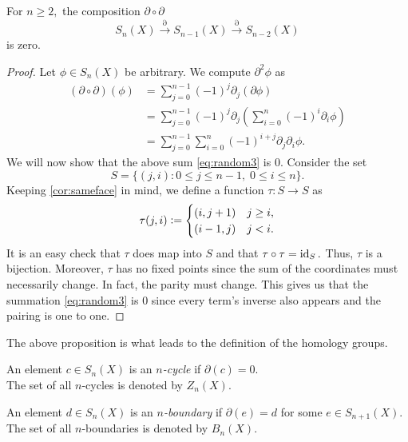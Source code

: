 \documentclass[12pt]{article}
\begin{document}
\begin{prop}
	For $n \ge 2,$ the composition $\partial\circ\partial$
	\begin{equation*} 
		S_n(X) \overset{\partial}{\longrightarrow} S_{n-1}(X) \overset{\partial}{\longrightarrow} S_{n-2}(X)
	\end{equation*}
	is zero.
\end{prop}
\begin{proof} 
	Let $\phi \in S_n(X)$ be arbitrary. We compute $\partial^2\phi$ as
	\begin{align} 
		(\partial\circ\partial)(\phi) &= \sum_{j=0}^{n-1}(-1)^{j}\partial_j(\partial\phi)\nonumber\\
		&= \sum_{j=0}^{n-1}(-1)^j\partial_j\left(\sum_{i=0}^{n}(-1)^i\partial_i\phi\right)\nonumber\\
		&= \sum_{j=0}^{n-1}\sum_{i=0}^{n}(-1)^{i+j}\partial_j\partial_i\phi. \tag{$*$} \label{eq:random3}
	\end{align}
	We will now show that the above sum \cref{eq:random3} is $0.$ Consider the set
	\begin{equation*} 
		S = \{(j, i) : 0 \le j \le n-1,\; 0 \le i \le n\}.
	\end{equation*}
	Keeping \ref{cor:sameface} in mind, we define a function $\tau:S\to S$ as
	\begin{equation*} 
		\tau(j, i) \vcentcolon= \begin{cases}
			(i, j + 1) & j \ge i,\\
			(i-1, j) & j < i.
		\end{cases}
	\end{equation*}
	It is an easy check that $\tau$ does map into $S$ and that $\tau\circ\tau=\operatorname{id}_S.$ Thus, $\tau$ is a bijection. Moreover, $\tau$ has no fixed points since the sum of the coordinates must necessarily change. In fact, the parity must change. This gives us that the summation \cref{eq:random3} is $0$ since every term's inverse also appears and the pairing is one to one.
\end{proof}

The above proposition is what leads to the definition of the homology groups. 
\begin{defn}
	An element $c \in S_n(X)$ is an \emph{$n$-cycle} if $\partial(c) = 0.$\\
	The set of all $n$-cycles is denoted by $Z_n(X).$

	An element $d \in S_n(X)$ is an \emph{$n$-boundary} if $\partial(e) = d$ for some $e \in S_{n+1}(X).$\\
	The set of all $n$-boundaries is denoted by $B_n(X).$	
\end{defn}
\end{document}
